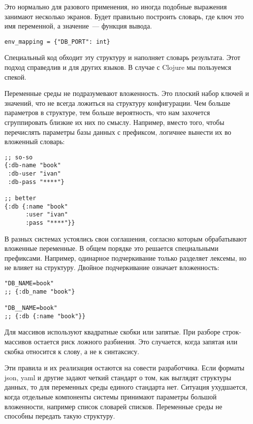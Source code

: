 Это нормально для разового применения, но иногда подобные выражения занимают
несколько экранов. Будет правильно построить словарь, где ключ это имя
переменной, а значение~--- функция вывода.

\begin{verbatim}
env_mapping = {"DB_PORT": int}
\end{verbatim}

Специальный код обходит эту структуру и наполняет словарь результата. Этот
подход справедлив и для других языков. В случае с Clojure мы пользуемся спекой.

Переменные среды не подразумевают вложенность. Это плоский набор ключей и
значений, что не всегда ложиться на структуру конфигурации. Чем больше
параметров в структуре, тем больше вероятность, что нам захочется сгруппировать
близкие их них по смыслу. Например, вместо того, чтобы перечислять параметры
базы данных с префиксом, логичнее вынести их во вложенный словарь:

\begin{verbatim}
;; so-so
{:db-name "book"
 :db-user "ivan"
 :db-pass "****"}

;; better
{:db {:name "book"
      :user "ivan"
      :pass "****"}}
\end{verbatim}

В разных системах устоялись свои соглашения, согласно которым обрабатывают
вложенные переменные. В общем порядке это решается специальными
префиксами. Например, одинарное подчеркивание только разделяет лексемы, но не
влияет на структуру. Двойное подчеркивание означает вложенность:

\begin{verbatim}
"DB_NAME=book"
;; {:db_name "book"}

"DB__NAME=book"
;; {:db {:name "book"}}
\end{verbatim}

Для массивов используют квадратные скобки или запятые. При разборе
строк-массивов остается риск ложного разбиения. Это случается, когда запятая или
скобка относится к слову, а не к синтаксису.

Эти правила и их реализация остаются на совести разработчика. Если форматы json,
yaml и другие задают четкий стандарт о том, как выглядят структуры данных, то
для переменных среды единого стандарта нет. Ситуация ухудшается, когда отдельные
компоненты системы принимают параметры большой вложенности, например список
словарей списков. Переменные среды не способны передать такую структуру.

